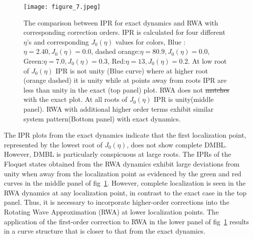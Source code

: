 \documentclass[%
reprint,
superscriptaddress,
amsmath,amssymb,
aps,
prb,
showkeys,
]{revtex4-2}
\providecommand{\DIFaddtex}[1]{{\protect\color{blue}\uwave{#1}}} %
\providecommand{\DIFdeltex}[1]{{\protect\color{red}\sout{#1}}}                      %
\providecommand{\DIFaddbegin}{} %
\providecommand{\DIFaddend}{} %
\providecommand{\DIFaddFL}[1]{\DIFadd{#1}} %
\providecommand{\DIFdelFL}[1]{\DIFdel{#1}} %
\providecommand{\DIFaddbeginFL}{} %
\providecommand{\DIFaddendFL}{} %
\providecommand{\DIFdelbeginFL}{} %
\providecommand{\DIFdelendFL}{} %
\providecommand{\DIFadd}[1]{\texorpdfstring{\DIFaddtex{#1}}{#1}} %
\providecommand{\DIFdel}[1]{\texorpdfstring{\DIFdeltex{#1}}{}} %
\newcommand{\DIFscaledelfig}{0.5}
\newlength{\DIFdelgraphicswidth} %
\newlength{\DIFdelgraphicsheight} %
\newcommand{\DIFaddincludegraphics}[2][]{{\color{blue}\fbox{\DIFOincludegraphics[#1]{#2}}}} %
\newcommand{\DIFdelincludegraphics}[2][]{%
\sbox{\DIFdelgraphicsbox}{\DIFOincludegraphics[#1]{#2}}%
\settoboxwidth{\DIFdelgraphicswidth}{\DIFdelgraphicsbox} %
\settoboxtotalheight{\DIFdelgraphicsheight}{\DIFdelgraphicsbox} %
\scalebox{\DIFscaledelfig}{%
\parbox[b]{\DIFdelgraphicswidth}{\usebox{\DIFdelgraphicsbox}\\[-\baselineskip] \rule{\DIFdelgraphicswidth}{0em}}\llap{\resizebox{\DIFdelgraphicswidth}{\DIFdelgraphicsheight}{%
\setlength{\unitlength}{\DIFdelgraphicswidth}%
\begin{picture}(1,1)%
\thicklines\linethickness{2pt} %
{\color[rgb]{1,0,0}\put(0,0){\framebox(1,1){}}}%
{\color[rgb]{1,0,0}\put(0,0){\line( 1,1){1}}}%
{\color[rgb]{1,0,0}\put(0,1){\line(1,-1){1}}}%
\end{picture}%
}\hspace*{3pt}}} %
} %
\DeclareRobustCommand{\DIFaddbegin}{\DIFOaddbegin \let\includegraphics\DIFaddincludegraphics} %
\DeclareRobustCommand{\DIFaddend}{\DIFOaddend \let\includegraphics\DIFOincludegraphics} %
\DeclareRobustCommand{\DIFaddbeginFL}{\DIFOaddbeginFL \let\includegraphics\DIFaddincludegraphics} %
\DeclareRobustCommand{\DIFaddendFL}{\DIFOaddendFL \let\includegraphics\DIFOincludegraphics} %
\DeclareRobustCommand{\DIFdelbeginFL}{\DIFOdelbeginFL \let\includegraphics\DIFdelincludegraphics} %
\DeclareRobustCommand{\DIFdelendFL}{\DIFOaddendFL \let\includegraphics\DIFOincludegraphics} %
\begin{document}
\begin{figure}[t!]
	\centering
	\DIFdelbeginFL %
\DIFdelendFL \DIFaddbeginFL \texttt{[image: figure\_7.jpeg]}
	\DIFaddendFL \caption{The comparison between IPR for exact dynamics and RWA with corresponding correction orders. IPR is calculated for four different $\eta$'s and corresponding $J_0(\eta)$ values for colors, Blue :$\eta = 2.40, J_0(\eta) = 0.0$, dashed orange:$\eta = 80.9, J_0(\eta) = 0.0$, Green:$\eta =7.0, J_0(\eta) = 0.3$, Red:$\eta = 13, J_0(\eta)= 0. 2$. At low root of $J_0(\eta)$ IPR is not unity (Blue curve) where at higher root (orange dashed) it is unity while at points away from roots IPR are less than unity in the exact (top panel) plot. RWA does not \DIFdelbeginFL \DIFdelFL{matches }\DIFdelendFL \DIFaddbeginFL \DIFaddFL{match }\DIFaddendFL with the exact plot. At all roots of $J_0(\eta)$ IPR is unity(middle panel). RWA with additional higher order terms exhibit similar system pattern(Bottom panel) with exact dynamics.}
	\label{fig:lmg_ipr_rwa11}
\end{figure}
The IPR plots from the exact dynamics indicate that the first localization point, represented by the lowest  root of $J_0(\eta)$, does not show complete DMBL. However, DMBL is particularly conspicuous at large roots. The IPRs of the Floquet states obtained from the RWA dynamics exhibit large deviations from unity when away from the localization point as evidenced by the green and red curves in the middle panel of fig\DIFaddbegin \DIFadd{.}\DIFaddend ~\ref{fig:lmg_ipr_rwa11}. However, complete localization is seen in the RWA dynamics at any localization point, in contrast to the exact case in the top panel. Thus, it is necessary to incorporate  higher-order corrections into the Rotating Wave Approximation (RWA) at lower localization points. The application of the first-order correction to RWA in the lower panel of fig\DIFaddbegin \DIFadd{.}\DIFaddend ~\ref{fig:lmg_ipr_rwa11} results in a curve structure that is closer to that from the exact dynamics.
\end{document}
